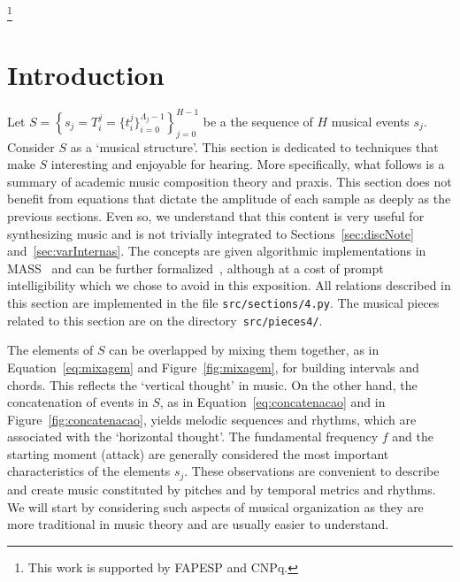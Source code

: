 \documentclass[format=acmsmall, review=false, screen=true]{acmart}
\newcommand{\mass}{MASS}
\begin{document}

%
%




\thanks{This work is supported by FAPESP and CNPq.}


\maketitle

\renewcommand{\shortauthors}{R. Fabbri et al.}


\section*{Introduction}
Let $S=\left\{  s_j=T_i^j=\{t_i^j\}_{i=0}^{\Lambda_j-1} \right\}_{j=0}^{H-1}$ be a the sequence of $H$ musical events $s_j$.
Consider $S$ as a `musical structure'.
This section is dedicated to techniques that make $S$ interesting and enjoyable for hearing.
More specifically, what follows is a summary of academic music composition theory and praxis.
This section does not benefit from equations that dictate the amplitude of each sample as deeply as the previous sections.
Even so, we understand that this content is very useful for synthesizing music and is not trivially integrated to Sections~\ref{sec:discNote}
and~\ref{sec:varInternas}.
The concepts are given algorithmic implementations in \mass~\cite{massListings} and can be further formalized~\cite{topos},
although at a cost of prompt intelligibility which we chose to avoid in this exposition.
All relations described in this section are implemented in the file \texttt{src/sections/4.py}.
The musical pieces related to this section are on the directory~\texttt{src/pieces4/}.~\cite{MASSA}

The elements of $S$ can be overlapped by mixing them together, as in
Equation~\ref{eq:mixagem} and Figure~\ref{fig:mixagem}, for building intervals and chords. This reflects the `vertical thought' in music. On the other hand, the concatenation of events
in $S$, as in Equation~\ref{eq:concatenacao} and in Figure~\ref{fig:concatenacao},
yields melodic sequences and rhythms, which are associated with the `horizontal thought'.
The fundamental frequency $f$ and the starting moment
(attack) are generally considered the most important characteristics of the elements $s_j$.
These observations are convenient to describe and create music constituted by pitches and by temporal metrics and rhythms.
We will start by considering such aspects of musical organization as they are more
traditional in music theory and are usually easier to understand.
\end{document}
